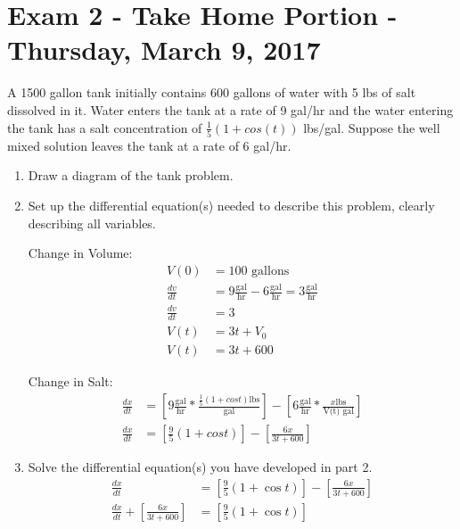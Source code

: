 \chapter{Exam 2 - Take Home Portion - Thursday, March 9, 2017}
\begin{prob}
A 1500 gallon tank initially contains 600 gallons of water with 5 lbs of salt dissolved in it. Water enters the tank at a rate of 9 gal/hr and the water entering the tank has a salt concentration of $\frac{1}{5} (1+cos(t))$ lbs/gal. Suppose the well mixed solution leaves the tank at a rate of 6 gal/hr.  
\renewcommand{\labelenumi}{\alph{enumi}}
\begin{enumerate}
    \item Draw a diagram of the tank problem.\\
    \item Set up the differential equation(s) needed to describe this problem, clearly describing all variables.
    \begin{step}
    Change in Volume:
    \begin{align*}
        V(0)&=100 \text{ gallons}\\
        \frac{dv}{dt}&=9\frac{\text{gal}}{\text{hr}}-6\frac{\text{gal}}{\text{hr}}=3\frac{\text{gal}}{\text{hr}}\\
        \frac{dv}{dt}&=3\\
        V(t)&=3t+V_0\\
        V(t)&=3t+600
    \end{align*}
    \end{step}
    \begin{step}
    Change in Salt:
    \begin{align*}
        \frac{dx}{dt}&=\left[ 9\frac{\text{gal}}{\text{hr}}*\frac{\frac{1}{5}(1+cost) \text{lbs}}{\text{gal}} \right] - \left[ 6\frac{\text{gal}}{\text{hr}} * \frac{x \text{lbs}}{\text{V(t) gal}} \right]\\
        \frac{dx}{dt}&=\left[ \frac{9}{5}(1+cost) \right] - \left[ \frac{6x}{3t+600}\right]
    \end{align*}
    \end{step}
    \item Solve the differential equation(s) you have developed in part 2.
    \begin{align*}
        \frac{dx}{dt}&=\left[ \frac{9}{5}(1+\cos t) \right] - \left[ \frac{6x}{3t+600}\right]\\
    \frac{dx}{dt} + \left[ \frac{6x}{3t+600}\right] &= \left[ \frac{9}{5}(1+\cos t) \right]\\

\end{align*}
\end{enumerate}
\end{prob}
